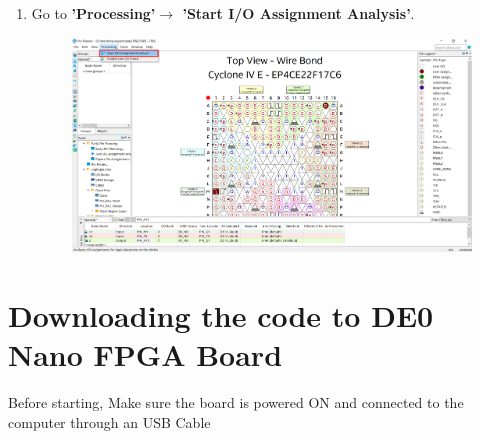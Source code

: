 \documentclass[12pt]{article}
\begin{document}
\begin{enumerate}
    
    \item Go to \textbf{'Processing'$\rightarrow$ 'Start I/O Assignment Analysis'}.
        \begin{figure}[H]
             \centering
            \includegraphics[scale=0.35 ]{TWSPLAN3.png}
         \end{figure}
\end{enumerate}
\newpage
 \section{Downloading the code to DE0 Nano FPGA Board}
 Before starting, Make sure the board is powered ON and connected to the computer through an USB Cable
 
\end{document}
